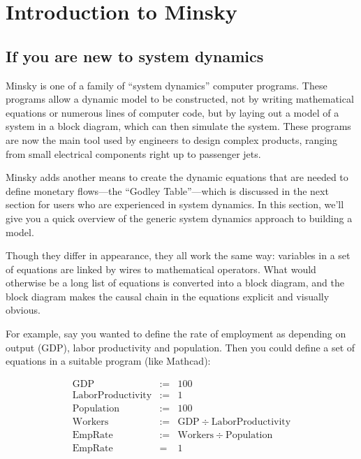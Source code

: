 
\chapter{Introduction to Minsky}

\label{Introduction-Minsky}

\section{If you are new to system dynamics}

\label{intro:new-system-dynamics}

Minsky is one of a family of ``system dynamics'' computer programs.
These programs allow a dynamic model to be constructed, not by writing
mathematical equations or numerous lines of computer code, but by
laying out a model of a system in a block diagram, which can then
simulate the system. These programs are now the main tool used by
engineers to design complex products, ranging from small electrical
components right up to passenger jets.

Minsky adds another means to create the dynamic equations that are
needed to define monetary flows---the ``Godley Table''---which
is discussed in the next section for users who are experienced in
system dynamics. In this section, we'll give you a quick overview
of the generic system dynamics approach to building a model.

Though they differ in appearance, they all work the same way: variables
in a set of equations are linked by wires to mathematical operators.
What would otherwise be a long list of equations is converted into
a block diagram, and the block diagram makes the causal chain in the
equations explicit and visually obvious.

For example, say you wanted to define the rate of employment as depending
on output (GDP), labor productivity and population. Then you could
define a set of equations in a suitable program (like Mathcad):

\begin{eqnarray*}
\mathrm{GDP} & := & 100\\
\mathrm{LaborProductivity} & := & 1\\
\mathrm{Population} & := & 100\\
\mathrm{Workers} & := & \mathrm{GDP}\div\mathrm{LaborProductivity}\\
\mathrm{EmpRate} & := & \mathrm{Workers}\div\mathrm{Population}\\
\mathrm{EmpRate} & = & 1
\end{eqnarray*}

